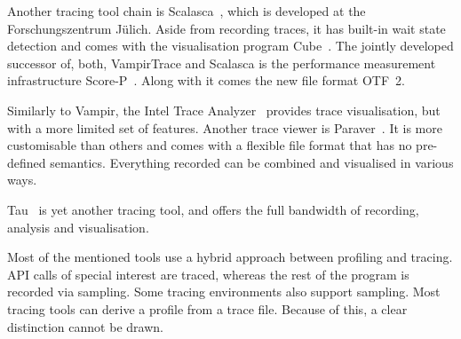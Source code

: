 \documentclass[a4paper, final, diplominf]{zih-template}
\begin{document}
Another tracing tool chain is Scalasca~\cite{geimer10}, which is developed at the Forschungszentrum J\"ulich.
Aside from recording traces, it has built-in wait state detection and comes with the visualisation program Cube~\cite{song04}.
The jointly developed successor of, both, VampirTrace and Scalasca is the performance measurement infrastructure Score-P~\cite{scorep10}.
Along with it comes the new file format OTF~2.

Similarly to Vampir, the Intel Trace Analyzer~\cite{ita} provides trace visualisation, but with a more limited set of features.
Another trace viewer is Paraver~\cite{pillet95}.
It is more customisable than others and comes with a flexible file format that has no pre-defined semantics.
Everything recorded can be combined and visualised in various ways.

Tau~\cite{shende06} is yet another tracing tool, and offers the full bandwidth of recording, analysis and visualisation.

Most of the mentioned tools use a hybrid approach between profiling and tracing.
API calls of special interest are traced, whereas the rest of the program is recorded via sampling.
Some tracing environments also support sampling.
Most tracing tools can derive a profile from a trace file.
Because of this, a clear distinction cannot be drawn.
\end{document}
